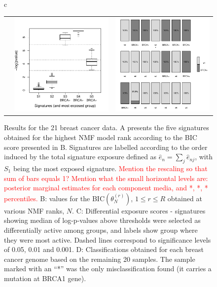 \documentclass{bioinfo}
\begin{document}
\begin{figure}[t!]
\begin{tabular}{c}
\begin{tabular}{ccc}
     &
     \includegraphics[width=5.5cm]{figs/Diffexp_boxplot_21bc_com_Opp_b2}
     &
     \includegraphics[width=5.5cm]{figs/Classific_result_with_Opp_5b}
   \end{tabular}
 \end{tabular}
 \caption{\textrm{%
   Results for the 21 breast cancer data. A presents the five
   signatures obtained for the highest NMF model rank according to the
   BIC score presented in B. Signatures are labelled according to the
   order induced by the total signature exposure defined as $\hat e_n =
   \sum_{j} \hat e_{nj}$, with $S_1$ being the most exposed
   signature. \textcolor{red}{Mention the rescaling so that sum of bars
   equals 1?  Mention what the small horizontal levels are: posterior
   marginal estimates for each component media, and *, *, * percentiles.}
   B: values for the BIC$(\theta^{(r)}_N)$, $1 \leq r \leq R$ obtained at
   various NMF ranks, $N$. C: Differential exposure scores - signatures
   showing median of log-p-values above thresholds were selected as
   differentially active among groups, and labels show group where they
   were most active.  Dashed lines correspond to
   significance levels of 0.05, 0.01 and 0.001. D: Classifications
   obtained for each breast cancer genome based on the remaining 20
   samples. The sample marked with an ``*'' was the only
   misclassification found (it carries a mutation at BRCA1 gene).
  }
 }\label{fig:bcancer} 
\end{figure}
\end{document}
